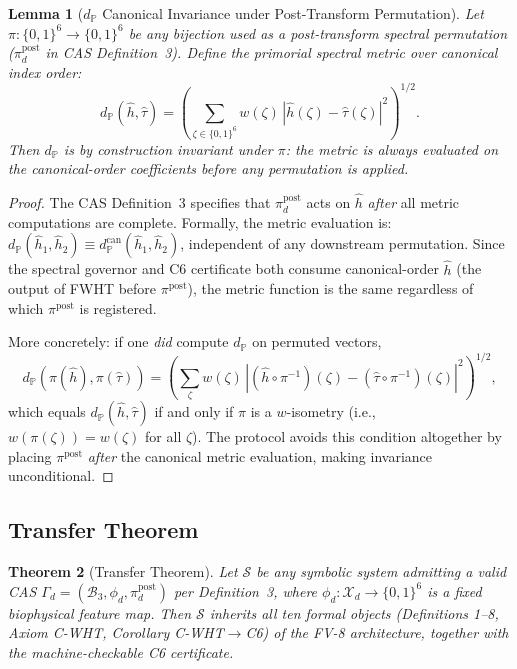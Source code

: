 \documentclass[12pt,letterpaper]{article}
\theoremstyle{definition}
\theoremstyle{plain}
\newtheorem{theorem}{Theorem}[section]
\newtheorem{lemma}[theorem]{Lemma}
\theoremstyle{remark}
\newcommand{\hhat}{\hat{h}}
\begin{document}
\begin{lemma}[$d_{\mathbb{P}}$ Canonical Invariance under Post-Transform Permutation]
\label{lem:dp-invariance}
Let $\pi : \{0,1\}^6 \to \{0,1\}^6$ be any bijection used as a post-transform
spectral permutation ($\pi_d^{\mathrm{post}}$ in CAS Definition~3).
Define the primorial spectral metric over \emph{canonical} index order:
\[
  d_{\mathbb{P}}(\hhat, \hat\tau)
    = \left(\sum_{\zeta\in\{0,1\}^6} w(\zeta)\,|\hhat(\zeta)-\hat\tau(\zeta)|^2\right)^{1/2}.
\]
Then $d_{\mathbb{P}}$ is \emph{by construction invariant} under $\pi$:
the metric is always evaluated on the canonical-order coefficients before
any permutation is applied.
\end{lemma}

\begin{proof}
The CAS Definition~3 specifies that $\pi_d^{\mathrm{post}}$ acts on $\hhat$
\emph{after} all metric computations are complete.
Formally, the metric evaluation is:
$d_{\mathbb{P}}(\hhat_1, \hhat_2) \equiv d_{\mathbb{P}}^{\mathrm{can}}(\hhat_1, \hhat_2)$,
independent of any downstream permutation.
Since the spectral governor and C6 certificate both consume canonical-order
$\hhat$ (the output of FWHT before $\pi^{\mathrm{post}}$), the metric
function is the same regardless of which $\pi^{\mathrm{post}}$ is registered.

More concretely: if one \emph{did} compute $d_{\mathbb{P}}$ on permuted vectors,
\[
  d_{\mathbb{P}}(\pi(\hhat), \pi(\hat\tau))
    = \left(\sum_\zeta w(\zeta)\,|(\hhat\circ\pi^{-1})(\zeta)
      - (\hat\tau\circ\pi^{-1})(\zeta)|^2\right)^{1/2},
\]
which equals $d_{\mathbb{P}}(\hhat,\hat\tau)$ if and only if $\pi$ is a
$w$-isometry (i.e., $w(\pi(\zeta)) = w(\zeta)$ for all $\zeta$).
The protocol avoids this condition altogether by placing $\pi^{\mathrm{post}}$
\emph{after} the canonical metric evaluation, making invariance unconditional.
\end{proof}

\subsection{Transfer Theorem}

\begin{theorem}[Transfer Theorem]
\label{thm:transfer}
Let $\mathcal{S}$ be any symbolic system admitting a valid CAS
$\Gamma_d = (\mathcal{B}_3, \phi_d, \pi_d^{\mathrm{post}})$ per
Definition~3, where $\phi_d : \mathcal{X}_d \to \{0,1\}^6$ is a fixed
biophysical feature map.  Then $\mathcal{S}$ inherits all ten formal
objects (Definitions 1--8, Axiom C-WHT, Corollary C-WHT$\to$C6) of
the FV-8 architecture, together with the machine-checkable C6 certificate.
\end{theorem}
\end{document}
